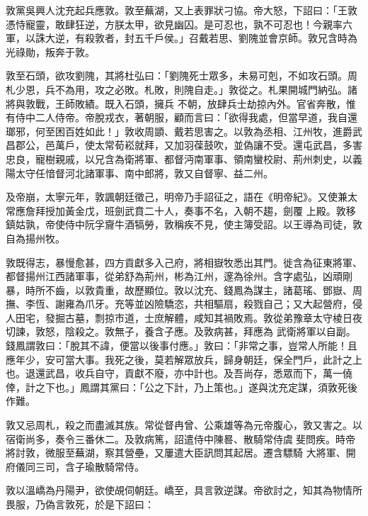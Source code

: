 \begin{pinyinscope}
 敦黨吳興人沈充起兵應敦。敦至蕪湖，又上表罪狀刁協。帝大怒，下詔曰：「王敦憑恃寵靈，敢肆狂逆，方朕太甲，欲見幽囚。是可忍也，孰不可忍也！今親率六軍，以誅大逆，有殺敦者，封五千戶侯。」召戴若思、劉隗並會京師。敦兄含時為光祿勛，叛奔于敦。



 敦至石頭，欲攻劉隗，其將杜弘曰：「劉隗死士眾多，未易可剋，不如攻石頭。周札少恩，兵不為用，攻之必敗。札敗，則隗自走。」敦從之。札果開城門納弘。諸將與敦戰，王師敗績。既入石頭，擁兵
 不朝，放肆兵士劫掠內外。官省奔散，惟有侍中二人侍帝。帝脫戎衣，著朝服，顧而言曰：「欲得我處，但當早道，我自還瑯邪，何至困百姓如此！」敦收周顗、戴若思害之。以敦為丞相、江州牧，進爵武昌郡公，邑萬戶，使太常荀崧就拜，又加羽葆鼓吹，並偽讓不受。還屯武昌，多害忠良，寵樹親戚，以兄含為衛將軍、都督沔南軍事、領南蠻校尉、荊州刺史，以義陽太守任愔督河北諸軍事、南中郎將，敦又自督寧、益二州。



 及帝崩，太寧元年，敦諷朝廷徵己，明帝乃手詔征之，語在《明帝紀》。又使兼太常應詹拜授加黃金戊，班劍武賁二十人，奏事不名，入朝不趨，劍覆
 上殿。敦移鎮姑孰，帝使侍中阮孚齎牛酒犒勞，敦稱疾不見，使主簿受詔。以王導為司徒，敦自為揚州牧。



 敦既得志，暴慢愈甚，四方貢獻多入己府，將相嶽牧悉出其門。徙含為征東將軍、都督揚州江西諸軍事，從弟舒為荊州，彬為江州，邃為徐州。含字處弘，凶頑剛暴，時所不齒，以敦貴重，故歷顯位。敦以沈充、錢鳳為謀主，諸葛瑤、鄧嶽、周撫、李恆、謝雍為爪牙。充等並凶險驕恣，共相驅扇，殺戮自己；又大起營府，侵人田宅，發掘古墓，剽掠市道，士庶解體，咸知其禍敗焉。敦從弟豫章太守棱日夜切諫，敦怒，陰殺之。敦無子，養含子應。及敦病甚，拜應為
 武衛將軍以自副。錢鳳謂敦曰：「脫其不諱，便當以後事付應。」敦曰：「非常之事，豈常人所能！且應年少，安可當大事。我死之後，莫若解眾放兵，歸身朝廷，保全門戶，此計之上也。退還武昌，收兵自守，貢獻不廢，亦中計也。及吾尚存，悉眾而下，萬一僥倖，計之下也。」鳳謂其黨曰：「公之下計，乃上策也。」遂與沈充定謀，須敦死後作難。



 敦又忌周札，殺之而盡滅其族。常從督冉曾、公乘雄等為元帝腹心，敦又害之。以宿衛尚多，奏令三番休二。及敦病篤，詔遣侍中陳晷、散騎常侍虞斐問疾。時帝將討敦，微服至蕪湖，察其營壘，又屢遣大臣訊問其起居。遷含驃騎
 大將軍、開府儀同三司，含子瑜散騎常侍。



 敦以溫嶠為丹陽尹，欲使覘伺朝廷。嶠至，具言敦逆謀。帝欲討之，知其為物情所畏服，乃偽言敦死，於是下詔曰：




\end{pinyinscope}
